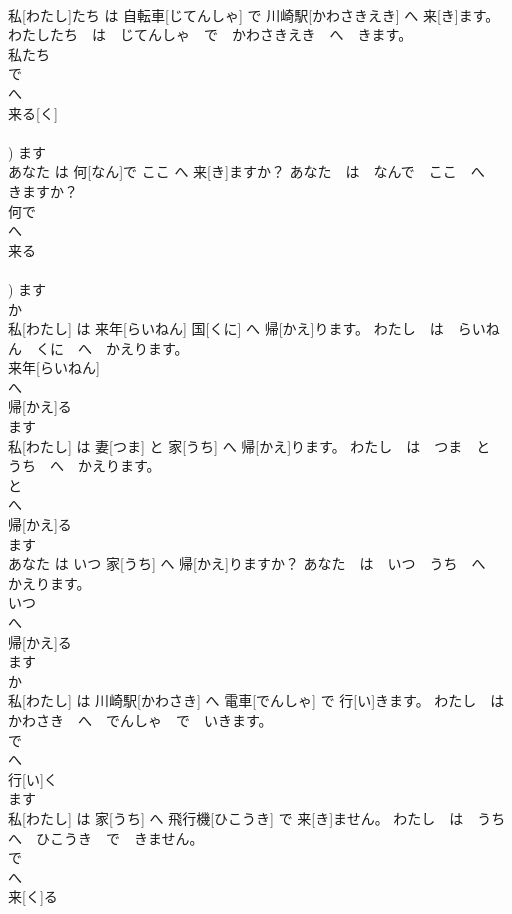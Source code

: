 \documentclass[8pt]{extreport}
\begin{document}
\begin{CJK}{UTF8}{min}
\\	私[わたし]たち は 自転車[じてんしゃ] で 川崎駅[かわさきえき] へ 来[き]ます。	わたしたち　は　じてんしゃ　で　かわさきえき　へ　きます。	
\\	私たち 
\\	で 
\\	へ 
\\	来る[く] 
\\	[くる] 
\\	[き])	ます 
\\	あなた は 何[なん]で ここ へ 来[き]ますか？	あなた　は　なんで　ここ　へ　きますか？	
\\	何で 
\\	へ 
\\	来る 
\\	[くる] 
\\	[き])	ます 
\\	か 
\\	私[わたし] は 来年[らいねん] 国[くに] へ 帰[かえ]ります。	わたし　は　らいねん　くに　へ　かえります。	
\\	来年[らいねん] 
\\	へ 
\\	帰[かえ]る 
\\	ます 
\\	私[わたし] は 妻[つま] と 家[うち] へ 帰[かえ]ります。	わたし　は　つま　と　うち　へ　かえります。	
\\	と 
\\	へ 
\\	帰[かえ]る 
\\	ます 
\\	あなた は いつ 家[うち] へ 帰[かえ]りますか？	あなた　は　いつ　うち　へ　かえります。	
\\	いつ 
\\	へ 
\\	帰[かえ]る 
\\	ます 
\\	か 
\\	私[わたし] は 川崎駅[かわさき] へ 電車[でんしゃ] で 行[い]きます。	わたし　は　かわさき　へ　でんしゃ　で　いきます。	
\\	で 
\\	へ 
\\	行[い]く 
\\	ます 
\\	私[わたし] は 家[うち] へ 飛行機[ひこうき] で 来[き]ません。	わたし　は　うち　へ　ひこうき　で　きません。	
\\	で 
\\	へ 
\\	来[く]る 

\end{CJK}
\end{document}
